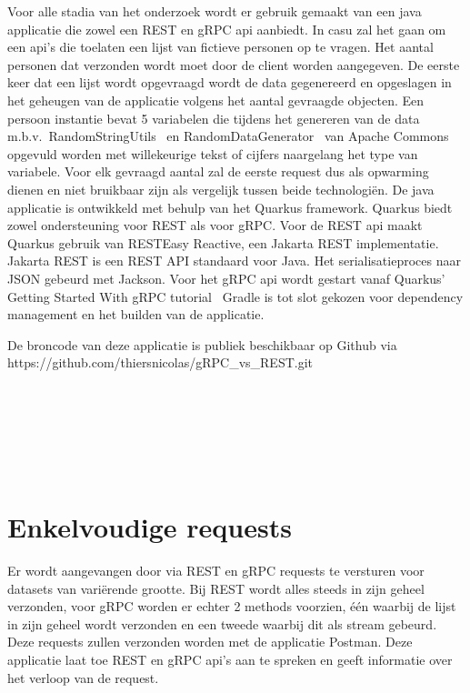 Voor alle stadia van het onderzoek wordt er gebruik gemaakt van een java applicatie die zowel een REST en gRPC api aanbiedt.
In casu zal het gaan om een api's die toelaten een lijst van fictieve personen op te vragen. Het aantal personen dat verzonden wordt moet door de client worden aangegeven.
De eerste keer dat een lijst wordt opgevraagd wordt de data gegenereerd en opgeslagen in het geheugen van de applicatie volgens het aantal gevraagde objecten.
Een persoon instantie bevat 5 variabelen die tijdens het genereren van de data m.b.v.\ RandomStringUtils~\parencite{RandomStringUtils}
en RandomDataGenerator~\parencite{RandomDataGenerator} van Apache Commons opgevuld worden met willekeurige tekst of cijfers naargelang het type van variabele.
Voor elk gevraagd aantal zal de eerste request dus als opwarming dienen en niet bruikbaar zijn als vergelijk tussen beide technologiën.
De java applicatie is ontwikkeld met behulp van het Quarkus framework. Quarkus biedt zowel ondersteuning voor REST als voor gRPC.
Voor de REST api maakt Quarkus gebruik van RESTEasy Reactive, een Jakarta REST implementatie. Jakarta REST is een REST API standaard voor Java.
Het serialisatieproces naar JSON gebeurd met Jackson. Voor het gRPC api wordt gestart vanaf Quarkus' Getting Started With gRPC tutorial~\parencite{quarkusgRPC}
Gradle is tot slot gekozen voor dependency management en het builden van de applicatie.

De broncode van deze applicatie is publiek beschikbaar op Github via https://github.com/thiersnicolas/gRPC_vs_REST.git



~\autocite{quarkusAbout}\\
~\autocite{quarkusREST}\\
~\autocite{Jakarta}\\
~\autocite{quarkusgRPC}\\
~\autocite{Gradle}\\

\section{Enkelvoudige requests}

Er wordt aangevangen door via REST en gRPC requests te versturen voor datasets van variërende grootte. Bij REST wordt alles steeds in zijn geheel verzonden,
voor gRPC worden er echter 2 methods voorzien, één waarbij de lijst in zijn geheel wordt verzonden en een tweede waarbij dit als stream gebeurd.
Deze requests zullen verzonden worden met de applicatie Postman. Deze applicatie laat toe REST en gRPC api's aan te spreken en geeft informatie over het verloop van de request.

